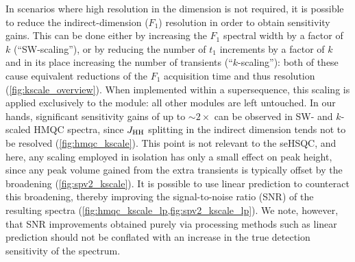 \documentclass[11pt]{article}
\newcommand*{\nitrogen}{\ce{^{15}N}}
\newcommand*{\jhh}{J_{\ce{HH}}}
\begin{document}
\begin{refsection}
In scenarios where high resolution in the \nitrogen{} dimension is not required, it is possible to reduce the indirect-dimension ($F_1$) resolution in order to obtain sensitivity gains.
This can be done either by increasing the $F_1$ spectral width by a factor of $k$ (``SW-scaling''), or by reducing the number of $t_1$ increments by a factor of $k$ and in its place increasing the number of transients (``$k$-scaling'')\autocite{Perez-Trujillo2007MRC, Parella2010CMR}: both of these cause equivalent reductions of the $F_1$ acquisition time and thus resolution (\cref{fig:kscale_overview}).
When implemented within a supersequence, this scaling is applied exclusively to the \nitrogen{} module: all other modules are left untouched.
In our hands, significant sensitivity gains of up to $\sim 2\times$ can be observed in SW- and $k$-scaled \nitrogen{} HMQC spectra, since $\jhh$ splitting in the indirect dimension tends not to be resolved (\cref{fig:hmqc_kscale}).
This point is not relevant to the seHSQC, and here, any scaling employed in isolation has only a small effect on peak height, since any peak volume gained from the extra transients is typically offset by the broadening (\cref{fig:spv2_kscale}).
It is possible to use linear prediction\autocite{linearpred} to counteract this broadening, thereby improving the signal-to-noise ratio (SNR) of the resulting spectra (\cref{fig:hmqc_kscale_lp,fig:spv2_kscale_lp}).
We note, however, that SNR improvements obtained purely via processing methods such as linear prediction should not be conflated with an increase in the true detection sensitivity of the spectrum.\autocite{snrsens}



\end{refsection}
\end{document}
